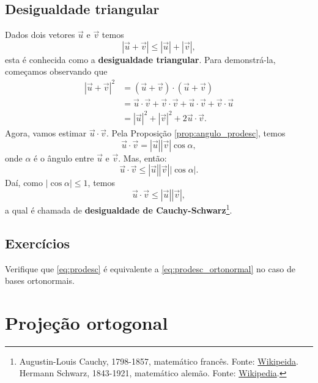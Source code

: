 \subsection{Desigualdade triangular}

Dados dois vetores $\vec{u}$ e $\vec{v}$ temos
\begin{equation}
  |\vec{u}+\vec{v}| \leq |\vec{u}| + |\vec{v}|,
\end{equation}
esta é conhecida como a {\bf desigualdade triangular}. Para demonstrá-la, começamos observando que
\begin{align}
  |\vec{u}+\vec{v}|^2 &= (\vec{u}+\vec{v})\cdot(\vec{u}+\vec{v})\\
                      &= \vec{u}\cdot\vec{v}+\vec{v}\cdot\vec{v}+\vec{u}\cdot\vec{v}+\vec{v}\cdot\vec{u}\\
                      &= |\vec{u}|^2 + |\vec{v}|^2 + 2\vec{u}\cdot\vec{v}.  
\end{align}
Agora, vamos estimar $\vec{u}\cdot\vec{v}$. Pela Proposição \ref{prop:angulo_prodesc}, temos
\begin{equation}
  \vec{u}\cdot\vec{v} = |\vec{u}||\vec{v}|\cos\alpha,
\end{equation}
onde $\alpha$ é o ângulo entre $\vec{u}$ e $\vec{v}$. Mas, então:
\begin{equation}
  \vec{u}\cdot\vec{v} \leq |\vec{u}||\vec{v}||\cos\alpha|.
\end{equation}
Daí, como $|\cos\alpha|\leq 1$, temos
\begin{equation}
  \vec{u}\cdot\vec{v}\leq |\vec{u}||\vec{v}|,
\end{equation}
a qual é chamada de {\bf desigualdade de Cauchy-Schwarz}\footnote{Augustin-Louis Cauchy, 1798-1857, matemático francês. Fonte: \href{https://en.wikipedia.org/wiki/Augustin-Louis_Cauchy}{Wikipeida}. Hermann Schwarz, 1843-1921, matemático alemão. Fonte: \href{https://en.wikipedia.org/wiki/Hermann\_Schwarz}{Wikipedia}.}.


\subsection*{Exercícios}

\begin{exer}\label{exer:prodesc_orto}
  Verifique que \eqref{eq:prodesc} é equivalente a \eqref{eq:prodesc_ortonormal} no caso de bases ortonormais.
\end{exer}


\emconstrucao

\section{Projeção ortogonal}\label{cap_prodesc_sec_proj}


